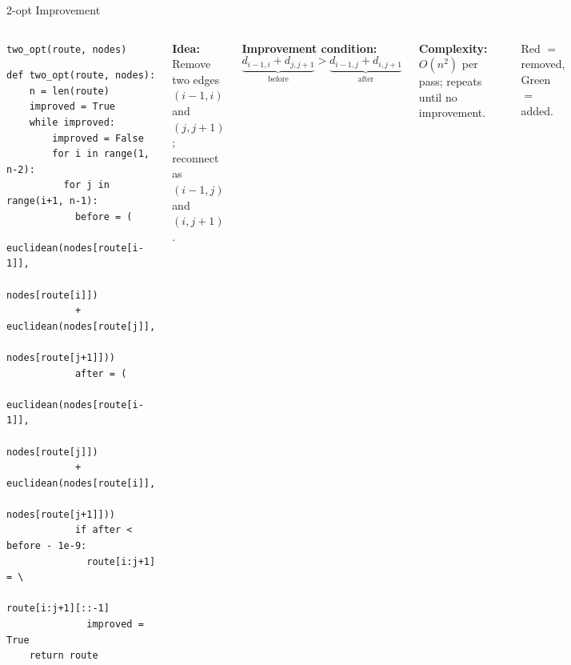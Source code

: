 \documentclass{beamer}
\begin{document}
\begin{frame}[fragile]{2-opt Improvement}

\begin{columns}[T]

\begin{block}{\texttt{two\_opt(route, nodes)}}
\begin{lstlisting}
def two_opt(route, nodes):
    n = len(route)
    improved = True
    while improved:
        improved = False
        for i in range(1, n-2):
          for j in range(i+1, n-1):
            before = (
              euclidean(nodes[route[i-1]],
                        nodes[route[i]])
            + euclidean(nodes[route[j]],
                        nodes[route[j+1]]))
            after = (
              euclidean(nodes[route[i-1]],
                        nodes[route[j]])
            + euclidean(nodes[route[i]],
                        nodes[route[j+1]]))
            if after < before - 1e-9:
              route[i:j+1] = \
                route[i:j+1][::-1]
              improved = True
    return route
\end{lstlisting}
\end{block}

\small
\textbf{Idea:} Remove two edges $(i{-}1,i)$ and $(j, j{+}1)$; reconnect as $(i{-}1,j)$ and $(i, j{+}1)$.

\vspace{0.3em}
\textbf{Improvement condition:}
\[
  \underbrace{d_{i-1,i} + d_{j,j+1}}_{\text{before}}
  > \underbrace{d_{i-1,j} + d_{i,j+1}}_{\text{after}}
\]

\vspace{0.3em}
\textbf{Complexity:} $O(n^2)$ per pass; repeats until no improvement.

\vspace{0.3em}
\begin{center}
\end{center}
\footnotesize Red $=$ removed, Green $=$ added.
\end{columns}

\end{frame}
\end{document}
